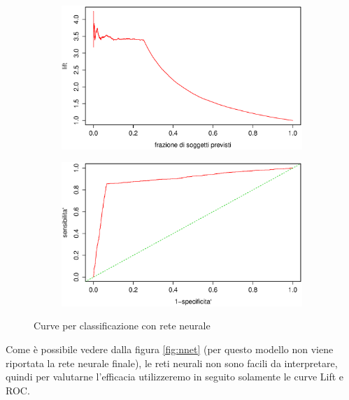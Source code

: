 \begin{figure}[H]
  \begin{subfigure}{0.4\textwidth}
    \includegraphics[width=\columnwidth]{images/class/lift-nnet.eps}
  \end{subfigure}
  \hspace*{\fill}
  \begin{subfigure}{0.4\textwidth}
    \includegraphics[width=\columnwidth]{images/class/roc-nnet.eps}
  \end{subfigure}
  \caption{Curve per classificazione con rete neurale}
  \label{fig:class-reg-1og}
\end{figure}

Come è possibile vedere dalla figura \ref{fig:nnet} (per questo modello non
viene riportata la rete neurale finale), le reti neurali non sono facili da
interpretare, quindi per valutarne l'efficacia utilizzeremo in seguito
solamente le curve Lift e ROC.


